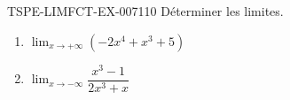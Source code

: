 \begin{exercice}{TSPE-LIMFCT-EX-007}{1}{10}
Déterminer les limites.
\begin{enumerate}
  \item $\lim_{x \to +\infty} (-2x^4 + x^3 + 5)$
  \item $\lim_{x \to -\infty} \dfrac{x^3 - 1}{2x^3 + x}$
\end{enumerate}
\end{exercice}
